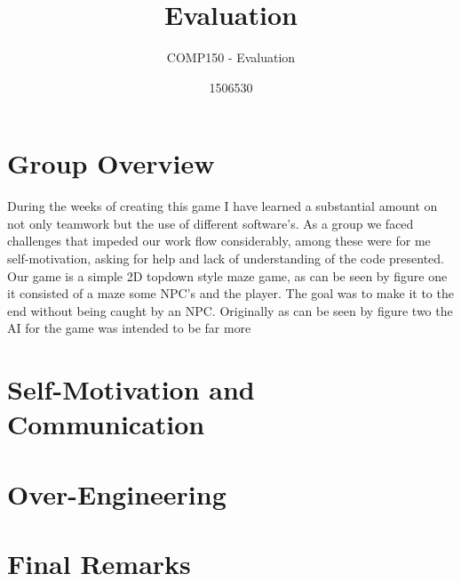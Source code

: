 \documentclass{scrartcl}
\title{Evaluation}
\subtitle{COMP150 - Evaluation}
\author{1506530}
\begin{document}
\maketitle

\section{Group Overview}

During the weeks of creating this game I have learned a substantial amount on not only teamwork but the use of different software's. As a group we faced challenges that impeded our work flow considerably, among these were for me self-motivation, asking for help and lack of understanding of the code presented. Our game is a simple 2D topdown style maze game, as can be seen by figure one it consisted of a maze some NPC's and the player. The goal was to make it to the end without being caught by an NPC. Originally as can be seen by figure two the AI for the game was intended to be far more 

\section{Self-Motivation and Communication}


\section{Over-Engineering}


\section{Final Remarks}





\end{document}

